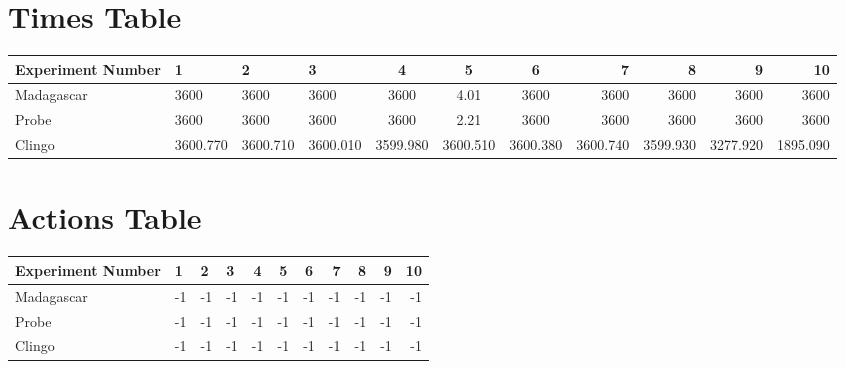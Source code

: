 \documentclass[8pt]{article}
\begin{document}
\begin{landscape}
\section{Times Table}\begin{tabular}{ | l | l | l | l | c | c | c | r | r | r | r | }\hline
Experiment Number & 1 & 2 & 3 & 4 & 5 & 6 & 7 & 8 & 9 & 10\\  \hline
Madagascar & 3600 & 3600 & 3600 & 3600 & 4.01 & 3600 & 3600 & 3600 & 3600 & 3600\\  \hline
Probe & 3600 & 3600 & 3600 & 3600 & 2.21 & 3600 & 3600 & 3600 & 3600 & 3600\\  \hline
Clingo & 3600.770 & 3600.710 & 3600.010 & 3599.980 & 3600.510 & 3600.380 & 3600.740 & 3599.930 & 3277.920 & 1895.090\\ \hline
\end{tabular}
\section{Actions Table}\begin{tabular}{ | l | l | l | l | c | c | c | r | r | r | r | }\hline
Experiment Number & 1 & 2 & 3 & 4 & 5 & 6 & 7 & 8 & 9 & 10\\ \hline
 Madagascar & -1 & -1 & -1 & -1 & -1 & -1 & -1 & -1 & -1 & -1\\ \hline
 Probe & -1 & -1 & -1 & -1 & -1 & -1 & -1 & -1 & -1 & -1\\ \hline
 Clingo & -1 & -1 & -1 & -1 & -1 & -1 & -1 & -1 & -1 & -1\\ \hline
\end{tabular}
\end{landscape}
\end{document}
